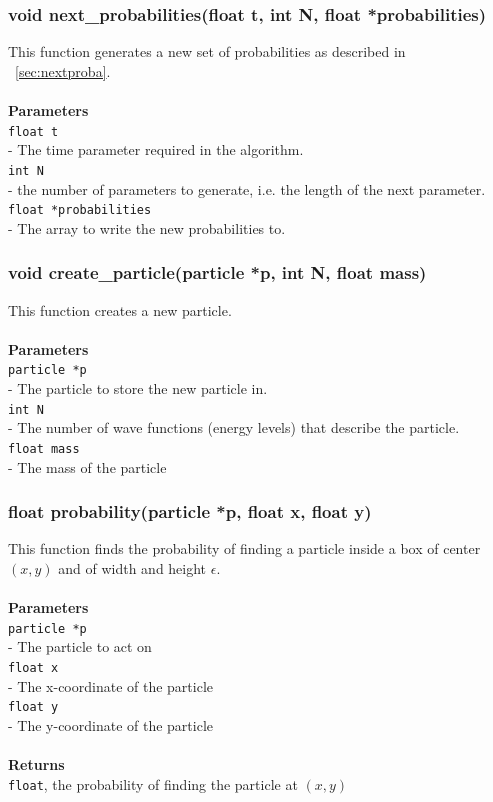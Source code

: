 \documentclass[a4paper, 10pt]{article}
\def\mar{\hspace*{5mm}}
\begin{document}
        \vspace{1cm}
        \subsubsection{void next\_probabilities(float t, int N, float *probabilities)}
        This function generates a new set of probabilities as described in ~\ref{sec:nextproba}.
        \\\\{\bf Parameters}\\
        \verb|float t|\\\mar- The time parameter required in the algorithm.\\
        \verb|int N|\\\mar- the number of parameters to generate, i.e. the length of
        the next parameter.\\
        \verb|float *probabilities|\\\mar- The array to write the new probabilities to.

        \vspace{1cm}
        \subsubsection{void create\_particle(particle *p, int N, float mass)}
        This function creates a new particle.\\
        \\{\bf Parameters}\\
        \verb|particle *p|\\\mar- The particle to store the new particle in.\\
        \verb|int N|\\\mar- The number of wave functions (energy levels) that describe
        the particle.\\
        \verb|float mass|\\\mar- The mass of the particle

        \vspace{1cm}
        \subsubsection{float probability(particle *p, float x, float y)}
        This function finds the probability of finding a particle inside a box of center
        $(x, y)$ and of width and height $\epsilon$.\\
        \\{\bf Parameters}\\
        \verb|particle *p|\\\mar- The particle to act on\\
        \verb|float x|\\\mar- The x-coordinate of the particle\\
        \verb|float y|\\\mar- The y-coordinate of the particle\\
        \\{\bf Returns}\\
        \verb|float|, the probability of finding the particle at $(x, y)$
\end{document}
